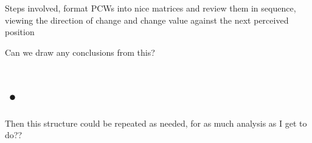 \bigskip

Steps involved, format PCWs into nice matrices and review them in sequence, viewing the direction of change and change value against the next perceived position

\bigskip 

Can we draw any conclusions from this? 

\section{•}
Then this structure could be repeated as needed, for as much analysis as I get to do??